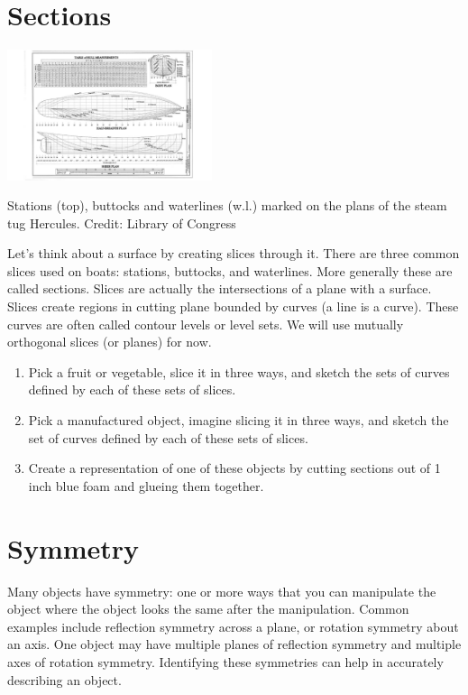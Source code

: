 \documentclass{tufte-handout}
\begin{document}
\section{Sections}

\begin{marginfigure}
\includegraphics[width=6cm]{figs/hercules_shiplines}
\caption{Stations (top), buttocks and waterlines (w.l.) marked on the plans of the steam tug Hercules. Credit: Library of Congress}
\end{marginfigure}

Let's think about a surface by creating slices through it. There are three common slices used on boats: stations, buttocks, and waterlines. More generally these are called sections. Slices are actually the intersections of a plane with a surface. Slices create regions in cutting plane bounded by curves (a line is a curve). These curves are often called contour levels or level sets. We will use mutually orthogonal slices (or planes) for now.

\begin{enumerate}
\item Pick a fruit or vegetable, slice it in three ways, and sketch the sets of curves defined by each of these sets of slices.
\item Pick a manufactured object, imagine slicing it in three ways, and sketch the set of curves defined by each of these sets of slices.
\item Create a representation of one of these objects by cutting sections out of 1 inch blue foam and glueing them together.
\end{enumerate}

\section{Symmetry}

Many objects have symmetry:  one or more ways that you can manipulate the object where the object looks the same after the manipulation.  Common examples include reflection symmetry across a plane, or rotation symmetry about an axis.  One object may have multiple planes of reflection symmetry and multiple axes of rotation symmetry.  Identifying these symmetries can help in accurately describing an object.
\end{document}
